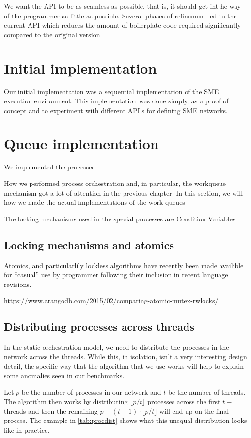 We want the API to be as seamless as possible, that is, it should get
int he way of the programmer as little as possible. Several phases of
refinement led to the current API which reduces the amount of
boilerplate code required  significantly compared to the original version

\section{Initial implementation}
Our initial implementation was a sequential implementation of the
SME execution environment. This implementation was done simply, as a
proof of concept and to experiment with different API's for defining
SME networks.

\section{Queue implementation}
We implemented the processes 


How we performed process orchestration and, in particular, the
workqueue mechanism got a lot of attention in the previous chapter. In
this section, we will how we made the actual implementations of the
work queues

The locking mechanisms used in the special processes are Condition
Variables \cite{Hoare:1974:MOS:355620.361161}

\subsection{Locking mechanisms and atomics}


Atomics, and particularlily lockless algorithms have recently been
made availible for ``casual'' use by programmer following their
inclusion in recent language revisions.

https://www.arangodb.com/2015/02/comparing-atomic-mutex-rwlocks/

\subsection{Distributing processes across threads}
In the static orchestration model, we need to distribute the processes
in the network across the threads. While this, in isolation, isn't a
very interesting design detail, the specific way that the algorithm
that we use works will help to explain some anomalies seen in our
benchmarks.

Let $p$ be the number of processes in our network and $t$ be the
number of threads. The algorithm then works by distributing
$\lfloor p/t\rfloor$ processes across the first $t-1$ threads and then
the remaining $p-(t-1)\cdot\lfloor p/t\rfloor$ will end up on the final
process. The example in \cref{tab:procdist} shows what this unequal
distribution looks like in practice.

